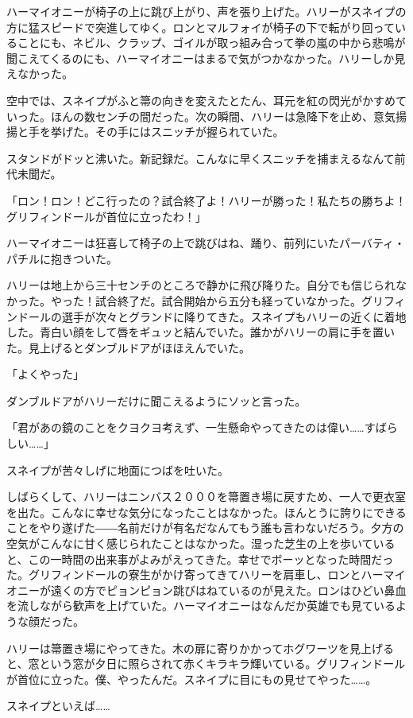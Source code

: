 \documentclass[10pt,a4paper]{article}
\begin{document}
\begin{CJK}{UTF8}{min}
ハーマイオニーが椅子の上に跳び上がり、声を張り上げた。ハリーがスネイプの方に猛スピードで突進してゆく。ロンとマルフォイが椅子の下で転がり回っていることにも、ネビル、クラップ、ゴイルが取っ組み合って拳の嵐の中から悲鳴が聞こえてくるのにも、ハーマイオニーはまるで気がつかなかった。ハリーしか見えなかった。

空中では、スネイプがふと箒の向きを変えたとたん、耳元を紅の閃光がかすめていった。ほんの数センチの間だった。次の瞬間、ハリーは急降下を止め、意気揚揚と手を挙げた。その手にはスニッチが握られていた。

スタンドがドッと沸いた。新記録だ。こんなに早くスニッチを捕まえるなんて前代未聞だ。

「ロン！ロン！どこ行ったの？試合終了よ！ハリーが勝った！私たちの勝ちよ！グリフィンドールが首位に立ったわ！」

ハーマイオニーは狂喜して椅子の上で跳びはね、踊り、前列にいたパーバティ・パチルに抱きついた。

ハリーは地上から三十センチのところで静かに飛び降りた。自分でも信じられなかった。やった！試合終了だ。試合開始から五分も経っていなかった。グリフィンドールの選手が次々とグランドに降りてきた。スネイプもハリーの近くに着地した。青白い顔をして唇をギュッと結んでいた。誰かがハリーの肩に手を置いた。見上げるとダンブルドアがほほえんでいた。

「よくやった」

ダンブルドアがハリーだけに聞こえるようにソッと言った。

「君があの鏡のことをクヨクヨ考えず、一生懸命やってきたのは偉い……すばらしい……」

スネイプが苦々しげに地面につばを吐いた。

しばらくして、ハリーはニンバス２０００を箒置き場に戻すため、一人で更衣室を出た。こんなに幸せな気分になったことはなかった。ほんとうに誇りにできることをやり遂げた――名前だけが有名だなんてもう誰も言わないだろう。夕方の空気がこんなに甘く感じられたことはなかった。湿った芝生の上を歩いていると、この一時間の出来事がよみがえってきた。幸せでボーッとなった時間だった。グリフィンドールの寮生がかけ寄ってきてハリーを肩車し、ロンとハーマイオニーが遠くの方でピョンピョン跳びはねているのが見えた。ロンはひどい鼻血を流しながら歓声を上げていた。ハーマイオニーはなんだか英雄でも見ているような顔だった。

ハリーは箒置き場にやってきた。木の扉に寄りかかってホグワーツを見上げると、窓という窓が夕日に照らされて赤くキラキラ輝いている。グリフィンドールが首位に立った。僕、やったんだ。スネイプに目にもの見せてやった……。

スネイプといえば……


\end{CJK}
\end{document}
